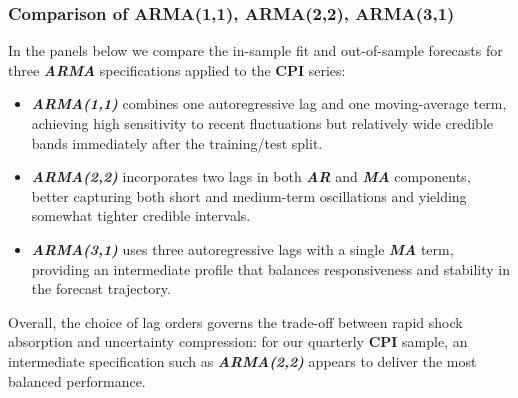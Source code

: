 \documentclass{Configuration_Files/PoliMi3i_thesis}
\begin{document}
\subsubsection*{Comparison of ARMA(1,1), ARMA(2,2), ARMA(3,1)}
In the panels below we compare the in-sample fit and out-of-sample forecasts for three \textbf{\textit{ARMA}} specifications applied to the \textbf{CPI} series:
\begin{itemize}
  \item \textbf{\textit{ARMA(1,1)}} combines one autoregressive lag and one moving-average term, achieving high sensitivity to recent fluctuations but relatively wide credible bands immediately after the training/test split.
  \item \textbf{\textit{ARMA(2,2)}} incorporates two lags in both \textbf{\textit{AR}} and \textbf{\textit{MA}} components, better capturing both short and medium-term oscillations and yielding somewhat tighter credible intervals.
  \item \textbf{\textit{ARMA(3,1)}} uses three autoregressive lags with a single \textbf{\textit{MA}} term, providing an intermediate profile that balances responsiveness and stability in the forecast trajectory.
\end{itemize}

Overall, the choice of lag orders governs the trade-off between rapid shock absorption and uncertainty compression: for our quarterly \textbf{CPI} sample, an intermediate specification such as \textbf{\textit{ARMA(2,2)}} appears to deliver the most balanced performance.
\newpage
\end{document}
